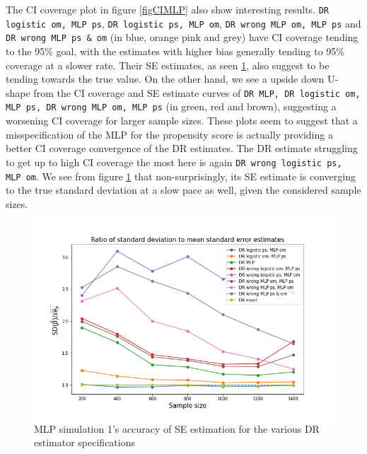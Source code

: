 \documentclass[12pt,twoside]{article}
\begin{document}
The CI coverage plot in figure \ref{figCIMLP} also show interesting results. \texttt{DR logistic om, MLP ps}, \texttt{DR logistic ps, MLP om}, \texttt{DR wrong MLP om, MLP ps} and \texttt{DR wrong MLP ps \& om} (in blue, orange pink and grey) have CI coverage tending to the 95\% goal, with the estimates with higher bias generally tending to 95\% coverage at a slower rate. Their SE estimates, as seen \ref{figSEMLP}, also suggest to be tending towards the true value. On the other hand, we see a upside down U-shape from the CI coverage and SE estimate curves of \texttt{DR MLP, DR logistic om, MLP ps, DR wrong MLP om, MLP ps} (in green, red and brown), suggesting a worsening CI coverage for larger sample sizes. These plots seem to suggest that a misspecification of the MLP for the propensity score is actually providing a better CI coverage convergence of the DR estimates. The DR estimate struggling to get up to high CI coverage the most here is again \texttt{DR wrong logistic ps, MLP om}. We see from figure \ref{figSEMLP} that non-surprisingly, its SE estimate is converging to the true standard deviation at a slow pace as well, given the considered sample sizes. 

\begin{figure}[h!]
    \centering
    \includegraphics[width = 0.9\columnwidth]{figures/SEMLP.png}
    \caption{MLP simulation 1's accuracy of \citet{lunceford_davidian} SE estimation for the various DR estimator specifications}
    \label{figSEMLP}
\end{figure}
\end{document}

